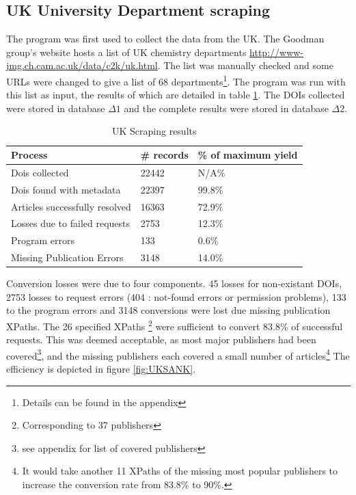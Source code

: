 \subsection{UK University Department scraping}
\label{sec:UKSCRAPE}
The program was first used to collect the data from the UK. The Goodman group's website hosts a list of UK chemistry departments \url{http://www-jmg.ch.cam.ac.uk/data/c2k/uk.html}. The list was manually checked and some URLs were changed to give a list of 68 departments\footnote{Details can be found in the appendix}. The program was run with this list as input, the results of which are detailed in table \ref{tab:UKSCRAPERES}. The DOIs collected were stored in database $\Delta1$ and the complete results were stored in database $\Delta2$.
\begin{table}[h!]
\caption{UK Scraping results}
\label{tab:UKSCRAPERES}
\begin{center}
\begin{tabular}{||l|l|l||}
\hline
Process & \# records & \% of maximum yield\\
\hline
Dois collected & 22442 & N/A\%\\
Dois found with metadata & 22397 & 99.8\%\\
Articles successfully resolved & 16363 & 72.9\%\\
Losses due to failed requests & 2753 & 12.3\%\\
Program errors & 133 & 0.6\%\\
Missing Publication Errors & 3148 & 14.0\% \\
\hline
\end{tabular}
\end{center}
\end{table}
Conversion losses were due to four components. 45 losses for non-existant DOIs, 2753 losses to request errors (404 : not-found errors or permission problems), 133 to the program errors and 3148 conversions were lost due missing publication XPaths. The 26 specified XPaths \footnote{Corresponding to 37 publishers} were sufficient to convert 83.8\% of successful requests. This was deemed acceptable, as most major publishers had been covered\footnote{see appendix for list of covered publishers}, and the missing publishers each covered a small number of articles\footnote{It would take another 11 XPaths of the missing most popular publishers to increase the conversion rate from 83.8\% to 90\%.}
The efficiency is depicted in figure \ref{fig:UKSANK}.

